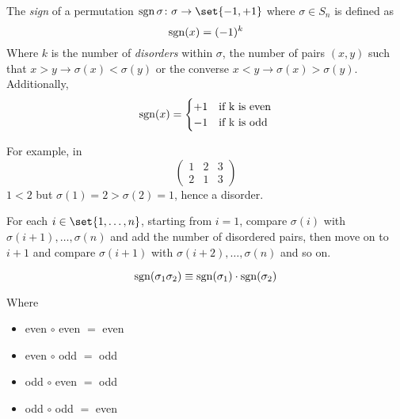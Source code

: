 \begin{definition}
    The \textit{sign} of a permutation $\Sign{\sigma} \colon \sigma \to \set{-1, +1}$ where $\sigma \in S_n$ is defined as
    \begin{equation}
        \operatorname{sgn}(x) = (-1)^{k}
    \end{equation}
    Where $k$ is the number of \textit{disorders} within $\sigma$, the number of pairs $(x, y)$ such that $x > y \to \sigma(x) < \sigma(y)$ or the converse $x < y \to \sigma(x) > \sigma(y)$. Additionally,
    \begin{equation}
        \operatorname{sgn}(x) = \begin{cases}
            +1 &\text{if k is even} \\
            -1 &\text{if k is odd}
        \end{cases}
    \end{equation}
\end{definition}

\begin{remark}
    For example, in
    \begin{equation*}
        \begin{pmatrix}
            1 & 2 & 3 \\
            2 & 1 & 3
        \end{pmatrix}
    \end{equation*}
    $1 < 2$ but $\sigma(1) = 2 > \sigma(2) = 1$, hence a disorder.
    
    For each $i \in \set{1, \dots, n}$, starting from $i = 1$, compare $\sigma(i)$ with $\sigma(i + 1), \dots, \sigma(n)$ and add the number of disordered pairs, then move on to $i + 1$ and compare $\sigma(i + 1)$ with $\sigma(i + 2), \dots, \sigma(n)$ and so on.
\end{remark}

\begin{theorem}
	\begin{equation}
		\operatorname{sgn}(\sigma_1 \sigma_2) \equiv \operatorname{sgn}(\sigma_1) \cdot \operatorname{sgn}(\sigma_2)
	\end{equation}
\end{theorem}

Where
\begin{itemize}
	\item even $\circ$ even $=$ even
	\item even $\circ$ odd $=$ odd
	\item odd $\circ$ even $=$ odd
	\item odd $\circ$ odd $=$ even
\end{itemize}

